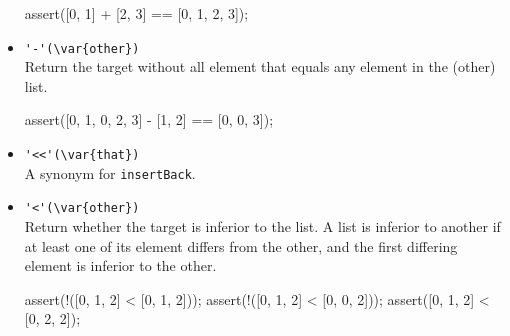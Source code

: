 \begin{itemize}
\begin{urbiscript}[firstnumber=last]
assert([0, 1] + [2, 3] == [0, 1, 2, 3]);
\end{urbiscript}

\item \lstinline|'-'(\var{other})|\\
Return the target without all element that equals any element in the
\var(other) list.

\begin{urbiscript}[firstnumber=last]
assert([0, 1, 0, 2, 3] - [1, 2] == [0, 0, 3]);
\end{urbiscript}

\item \lstinline|'<<'(\var{that})|\\
  A synonym for \lstinline|insertBack|.

\item \lstinline|'<'(\var{other})|\\
  Return whether the target is inferior to the  list. A
  list is inferior to another if at least one of its element differs
  from the other, and the first differing element is inferior to the
  other.

\begin{urbiscript}[firstnumber=last]
assert(!([0, 1, 2] < [0, 1, 2]));
assert(!([0, 1, 2] < [0, 0, 2]));
assert([0, 1, 2] < [0, 2, 2]);
\end{urbiscript}

\end{itemize}


